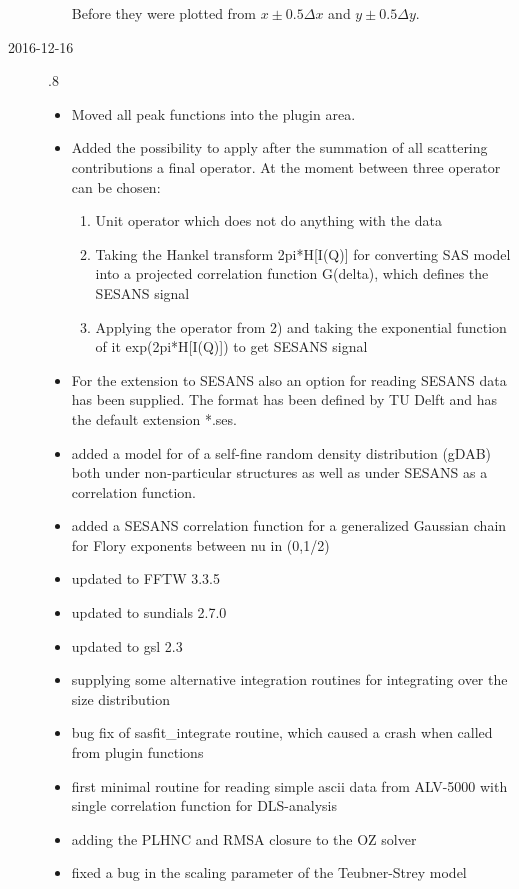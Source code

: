 \begin{description}
\begin{itemize}
          Before they were plotted from $x\pm0.5\Delta x$ and $y\pm0.5\Delta y$.
    \end{itemize}
\item[2016-12-16] .8
    \begin{itemize}
        \item Moved all peak functions into the plugin area.
        \item Added the possibility to apply after the summation of all scattering contributions a final operator.  At the moment between three operator can be chosen:
        \begin{enumerate}
            \item Unit operator which does not do anything with the data
            \item Taking the Hankel transform 2pi*H[I(Q)] for converting SAS model into a projected correlation function G(delta), which defines the SESANS signal
            \item Applying the operator from 2) and taking the exponential function of it exp(2pi*H[I(Q)]) to get SESANS signal
        \end{enumerate}
        \item For the extension to SESANS also an option for reading SESANS data has been supplied. The format has been defined by TU Delft and has the default extension *.ses.
        \item added a model for of a self-fine random density distribution (gDAB) both under non-particular  structures as well as under SESANS as a correlation function.
        \item added a SESANS correlation function for a generalized Gaussian chain for Flory exponents between nu in (0,1/2)
        \item updated to FFTW 3.3.5
        \item updated to sundials 2.7.0
        \item updated to gsl 2.3
        \item supplying some alternative integration routines for integrating over the size distribution
        \item bug fix of sasfit\_integrate routine, which caused a crash when called from plugin functions
        \item first minimal routine for reading simple ascii data from ALV-5000 with single correlation function for DLS-analysis
        \item adding the PLHNC and RMSA closure to the OZ solver
        \item fixed a bug in the scaling parameter of the Teubner-Strey model

\end{itemize}
\end{description}
